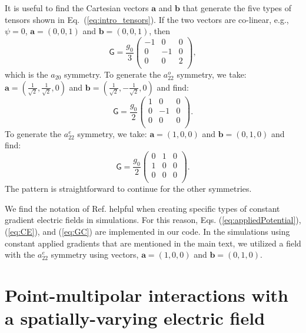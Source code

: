 It is useful to find the Cartesian vectors $\mathbf a$ and $\mathbf b$
that generate the five types of tensors shown in
Eq.~(\ref{eq:intro_tensors}).  If the two vectors are co-linear, e.g.,
$\psi=0$, $\mathbf{a}=(0,0,1)$ and $\mathbf{b}=(0,0,1)$, then
\begin{equation*}
\mathsf{G} = \frac{g_0}{3}
\begin{pmatrix}
-1 & 0 & 0 \\
0 & -1 & 0 \\
0 & 0 & 2 \\
\end{pmatrix} ,
\end{equation*}
which is the $a_{20}$ symmetry.
To generate the $a_{22}^o$ symmetry, we take:
$\mathbf{a}= (\frac{1}{\sqrt{2}}, \frac{1}{\sqrt{2}},0)$ and
$\mathbf{b}=(\frac{1}{\sqrt{2}}, -\frac{1}{\sqrt{2}},0)$
and find:
\begin{equation*}
\mathsf{G}=\frac{g_0}{2}
\begin{pmatrix}
1 & 0 & 0 \\
0 & -1 & 0 \\
0 & 0 & 0 \\
\end{pmatrix} .
\end{equation*}
To generate the $a_{22}^e$ symmetry, we take:
$\mathbf{a}= (1, 0, 0)$ and $\mathbf{b} = (0,1,0)$ and find:
\begin{equation*}
\mathsf{G}=\frac{g_0}{2}
\begin{pmatrix}
0 & 1 & 0 \\
1 & 0 & 0 \\
0 & 0 & 0 \\
\end{pmatrix} .
\end{equation*}
The pattern is straightforward to continue for the other symmetries.

We find the notation of Ref. \cite{Torres-del-Castillo:2006uo}
helpful when creating specific types of constant gradient electric
fields in simulations. For this reason,
Eqs. (\ref{eq:appliedPotential}), (\ref{eq:CE}), and (\ref{eq:GC}) are
implemented in our code.  In the simulations using constant applied
gradients that are mentioned in the main text, we utilized a field
with the $a_{22}^e$ symmetry using vectors, $\mathbf{a}= (1, 0, 0)$
and $\mathbf{b} = (0,1,0)$.

\section{Point-multipolar interactions with a spatially-varying electric field}

